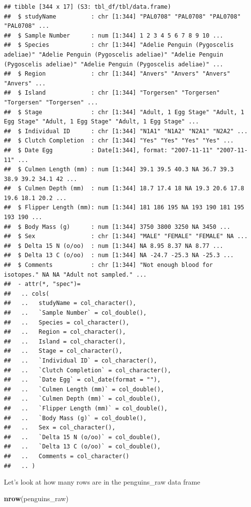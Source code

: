 \documentclass[
]{book}
\newenvironment{Shaded}{\begin{snugshade}}{\end{snugshade}}
\newcommand{\FunctionTok}[1]{\textcolor[rgb]{0.13,0.29,0.53}{\textbf{#1}}}
\newcommand{\NormalTok}[1]{#1}
\begin{document}
\begin{verbatim}
## tibble [344 x 17] (S3: tbl_df/tbl/data.frame)
##  $ studyName          : chr [1:344] "PAL0708" "PAL0708" "PAL0708" "PAL0708" ...
##  $ Sample Number      : num [1:344] 1 2 3 4 5 6 7 8 9 10 ...
##  $ Species            : chr [1:344] "Adelie Penguin (Pygoscelis adeliae)" "Adelie Penguin (Pygoscelis adeliae)" "Adelie Penguin (Pygoscelis adeliae)" "Adelie Penguin (Pygoscelis adeliae)" ...
##  $ Region             : chr [1:344] "Anvers" "Anvers" "Anvers" "Anvers" ...
##  $ Island             : chr [1:344] "Torgersen" "Torgersen" "Torgersen" "Torgersen" ...
##  $ Stage              : chr [1:344] "Adult, 1 Egg Stage" "Adult, 1 Egg Stage" "Adult, 1 Egg Stage" "Adult, 1 Egg Stage" ...
##  $ Individual ID      : chr [1:344] "N1A1" "N1A2" "N2A1" "N2A2" ...
##  $ Clutch Completion  : chr [1:344] "Yes" "Yes" "Yes" "Yes" ...
##  $ Date Egg           : Date[1:344], format: "2007-11-11" "2007-11-11" ...
##  $ Culmen Length (mm) : num [1:344] 39.1 39.5 40.3 NA 36.7 39.3 38.9 39.2 34.1 42 ...
##  $ Culmen Depth (mm)  : num [1:344] 18.7 17.4 18 NA 19.3 20.6 17.8 19.6 18.1 20.2 ...
##  $ Flipper Length (mm): num [1:344] 181 186 195 NA 193 190 181 195 193 190 ...
##  $ Body Mass (g)      : num [1:344] 3750 3800 3250 NA 3450 ...
##  $ Sex                : chr [1:344] "MALE" "FEMALE" "FEMALE" NA ...
##  $ Delta 15 N (o/oo)  : num [1:344] NA 8.95 8.37 NA 8.77 ...
##  $ Delta 13 C (o/oo)  : num [1:344] NA -24.7 -25.3 NA -25.3 ...
##  $ Comments           : chr [1:344] "Not enough blood for isotopes." NA NA "Adult not sampled." ...
##  - attr(*, "spec")=
##   .. cols(
##   ..   studyName = col_character(),
##   ..   `Sample Number` = col_double(),
##   ..   Species = col_character(),
##   ..   Region = col_character(),
##   ..   Island = col_character(),
##   ..   Stage = col_character(),
##   ..   `Individual ID` = col_character(),
##   ..   `Clutch Completion` = col_character(),
##   ..   `Date Egg` = col_date(format = ""),
##   ..   `Culmen Length (mm)` = col_double(),
##   ..   `Culmen Depth (mm)` = col_double(),
##   ..   `Flipper Length (mm)` = col_double(),
##   ..   `Body Mass (g)` = col_double(),
##   ..   Sex = col_character(),
##   ..   `Delta 15 N (o/oo)` = col_double(),
##   ..   `Delta 13 C (o/oo)` = col_double(),
##   ..   Comments = col_character()
##   .. )
\end{verbatim}

Let's look at how many rows are in the penguins\_raw data frame

\begin{Shaded}
\begin{Highlighting}[]
\FunctionTok{nrow}\NormalTok{(penguins\_raw)}
\end{Highlighting}
\end{Shaded}
\end{document}
